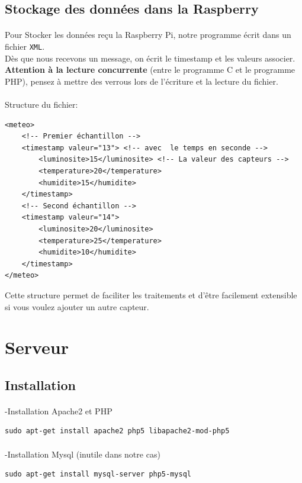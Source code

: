 \documentclass[a4paper, titlepage, oneside, 12pt]{article}%
\begin{document}
\subsection{Stockage des données dans la Raspberry}
\paragraph{}
Pour Stocker les données reçu la Raspberry Pi, notre programme écrit dans un fichier \texttt{XML}.\\
Dès que nous recevons un message, on écrit le timestamp et les valeurs associer.\\
\textbf{Attention à la lecture concurrente }(entre le programme C et le programme PHP), pensez à mettre des verrous lors de l’écriture et la lecture du fichier. \\
\\
Structure du fichier:
\begin{lstlisting}
<meteo>								
	<!-- Premier échantillon -->
	<timestamp valeur="13">	<!-- avec  le temps en seconde -->
		<luminosite>15</luminosite>	<!-- La valeur des capteurs -->
		<temperature>20</temperature>
		<humidite>15</humidite>
	</timestamp>		
	<!-- Second échantillon	-->
	<timestamp valeur="14">					
		<luminosite>20</luminosite>
		<temperature>25</temperature>
		<humidite>10</humidite>
	</timestamp>
</meteo>
\end{lstlisting}

Cette structure permet de faciliter les traitements et d'être facilement extensible si vous voulez ajouter un autre capteur.

\section{Serveur}
\subsection{Installation}
\paragraph{}
-Installation Apache2 et PHP
\begin{lstlisting}
sudo apt-get install apache2 php5 libapache2-mod-php5
\end{lstlisting}
\paragraph{}
-Installation Mysql (inutile dans notre cas)
\begin{lstlisting}
sudo apt-get install mysql-server php5-mysql
\end{lstlisting}
\end{document}
